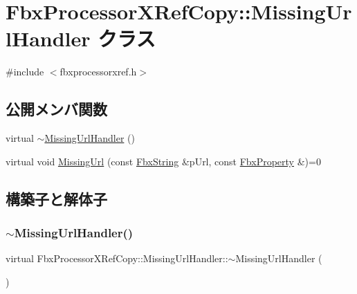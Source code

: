 \hypertarget{class_fbx_processor_x_ref_copy_1_1_missing_url_handler}{}\section{Fbx\+Processor\+X\+Ref\+Copy\+:\+:Missing\+Url\+Handler クラス}
\label{class_fbx_processor_x_ref_copy_1_1_missing_url_handler}


{\ttfamily \#include $<$fbxprocessorxref.\+h$>$}

\subsection*{公開メンバ関数}
\begin{DoxyCompactItemize}
\item 
virtual \hyperlink{class_fbx_processor_x_ref_copy_1_1_missing_url_handler_abfbeae2e370ac246814ad3ff04cd454f}{$\sim$\+Missing\+Url\+Handler} ()
\item 
virtual void \hyperlink{class_fbx_processor_x_ref_copy_1_1_missing_url_handler_aa1ccc43ba9aecf2345e282e63bf722f2}{Missing\+Url} (const \hyperlink{class_fbx_string}{Fbx\+String} \&p\+Url, const \hyperlink{class_fbx_property}{Fbx\+Property} \&)=0
\end{DoxyCompactItemize}


\subsection{構築子と解体子}
\mbox{\label{class_fbx_processor_x_ref_copy_1_1_missing_url_handler_abfbeae2e370ac246814ad3ff04cd454f}} 
\subsubsection{\texorpdfstring{$\sim$\+Missing\+Url\+Handler()}{~MissingUrlHandler()}}
{\footnotesize\ttfamily virtual Fbx\+Processor\+X\+Ref\+Copy\+::\+Missing\+Url\+Handler\+::$\sim$\+Missing\+Url\+Handler (\begin{DoxyParamCaption}{ }\end{DoxyParamCaption})\hspace{0.3cm}{\ttfamily [virtual]}}



